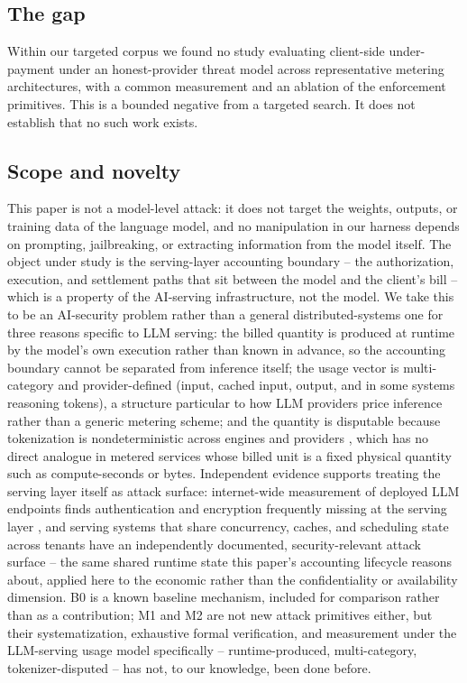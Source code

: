 \documentclass[manuscript,review]{acmart}
\begin{document}
\subsection{The gap}
Within our targeted corpus we found no study evaluating client-side under-payment under
an honest-provider threat model across representative metering architectures, with a
common measurement and an ablation of the enforcement primitives. This is a bounded
negative from a targeted search. It does not establish that no such work exists.

\subsection{Scope and novelty}
This paper is not a model-level attack: it does not target the weights, outputs, or
training data of the language model, and no manipulation in our harness depends on
prompting, jailbreaking, or extracting information from the model itself. The object
under study is the serving-layer accounting boundary -- the authorization, execution,
and settlement paths that sit between the model and the client's bill -- which is a
property of the AI-serving infrastructure, not the model. We take this to be an
AI-security problem rather than a general distributed-systems one for three reasons
specific to LLM serving: the billed quantity is produced at runtime by the model's own
execution rather than known in advance, so the accounting boundary cannot be separated
from inference itself; the usage vector is multi-category and provider-defined (input,
cached input, output, and in some systems reasoning tokens), a structure particular to
how LLM providers price inference rather than a generic metering scheme; and the
quantity is disputable because tokenization is nondeterministic across engines and
providers \citep{petrov}, which has no direct analogue in metered services whose billed
unit is a fixed physical quantity such as compute-seconds or bytes. Independent evidence
supports treating the serving layer itself as attack surface: internet-wide measurement
of deployed LLM endpoints finds authentication and encryption frequently missing at the
serving layer \citep{unveilinglandscape}, and serving systems that share concurrency,
caches, and scheduling state across tenants have an independently documented,
security-relevant attack surface \citep{grief,gift} -- the same shared runtime state this
paper's accounting lifecycle reasons about, applied here to the economic rather than the
confidentiality or availability dimension. B0 is a known baseline mechanism, included for
comparison rather than as a contribution; M1 and M2 are not new attack primitives either,
but their systematization, exhaustive formal verification, and measurement under the
LLM-serving usage model specifically -- runtime-produced, multi-category,
tokenizer-disputed -- has not, to our knowledge, been done before.
\end{document}
